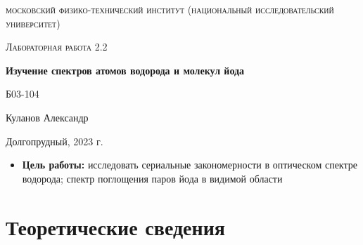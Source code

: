 \documentclass[a4paper, 12pt]{article}
\begin{document}
\begin{titlepage}
	\centering
	\vspace{5cm}
	{\scshape\LARGE московский физико-технический институт (национальный исследовательский университет) \par}
	\vspace{6cm}
	{\scshape\Large Лабораторная работа 2.2 \par}
	{\huge\bfseries Изучение спектров атомов водорода и молекул йода \par}
	\vspace{1cm}
	\vfill
\begin{flushright}
	{\large Б03-104}\par
	\vspace{0.3cm}
	{\LARGE Куланов Александр}
\end{flushright}
	

	\vfill


	Долгопрудный, 2023 г.
\end{titlepage}

\begin{itemize}
	\item \textbf{Цель работы:} исследовать сериальные закономерности в оптическом спектре водорода; спектр поглощения паров йода в видимой области
\end{itemize}

\section{Теоретические сведения}
\end{document}
